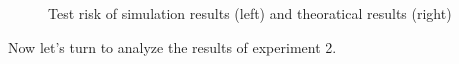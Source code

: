 \documentclass{article}
\begin{document}
\begin{figure}[H]
	\centering
	\qquad
	\hspace{-8mm}
	\caption{Test risk of simulation results (left) and theoratical results (right)}
	\label{fig:1}
\end{figure}

Now let's turn to analyze the results of experiment 2.
\end{document}
